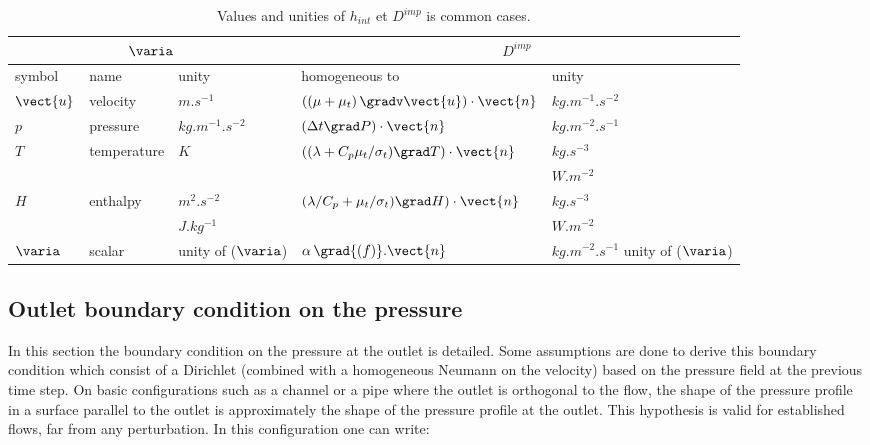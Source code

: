 \begin{table}
\begin{center}
\begin{tabular}{||l|l|l||l|l||}
\hline
\multicolumn{3}{||c||}{$\varia$} & \multicolumn{2}{c||}{$D^{imp}$} \\
\hline
symbol     & name                & unity         & homogeneous to             & unity                                     \\
\hline
$\vect{u}$ & velocity            & $m.s^{-1}$         &$\left( (\mu+\mu_t)\,\gradv \vect{u} \right)\cdot \vect{n}$  & $kg.m^{-1}.s^{-2} $       \\
$p$        & pressure            & $kg.m^{-1}.s^{-2}$ &$\left( \Delta t \grad P \right) \cdot \vect{n}$             & $kg.m^{-2}.s^{-1}$                        \\
$T$        & temperature         & $K$                &$\left( (\lambda+C_p\mu_t/\sigma_t)\grad T\right) \cdot \vect{n} $ &$kg.s^{-3}$ \\
                 &                         &                                     &                                  &$W.m^{-2}$ \\       
$H$          & enthalpy           & $m^{2}.s^{-2}$          &$\left( \lambda/C_p+\mu_t/\sigma_t) \grad H \right) \cdot \vect{n}$&$kg.s^{-3}$ \\
                 &                & $J.kg^{-1}$               &                                                                                                               & $W.m^{-2}$  \\
$\varia$   & scalar               & unity of ($\varia$)       &$\alpha\,\grad{(f)}.\vect{n}$              & $kg.m^{-2}.s^{-1}$ unity of ($\varia$)       \\
\hline
\end{tabular}
\end{center}
\caption{Values and unities of $h_{int}$ et $D^{imp}$  is common cases.}\label{tab:hint_phi_condli}
\end{table}

\subsection{Outlet boundary condition on the pressure}\label{Base_Condli_Sortie_Pression}

In this section the boundary condition on the pressure at the outlet is detailed. Some
assumptions are done to derive this boundary condition which consist of a Dirichlet
(combined with a homogeneous Neumann on the velocity) based on the pressure field
at the previous time step.
On basic configurations such as a channel or a pipe where the outlet is orthogonal 
to the flow, the shape of the pressure profile in a surface parallel to the outlet is
approximately the shape of the pressure profile at the outlet. This hypothesis 
is valid for established flows, far from any perturbation. In this configuration
one can write:

